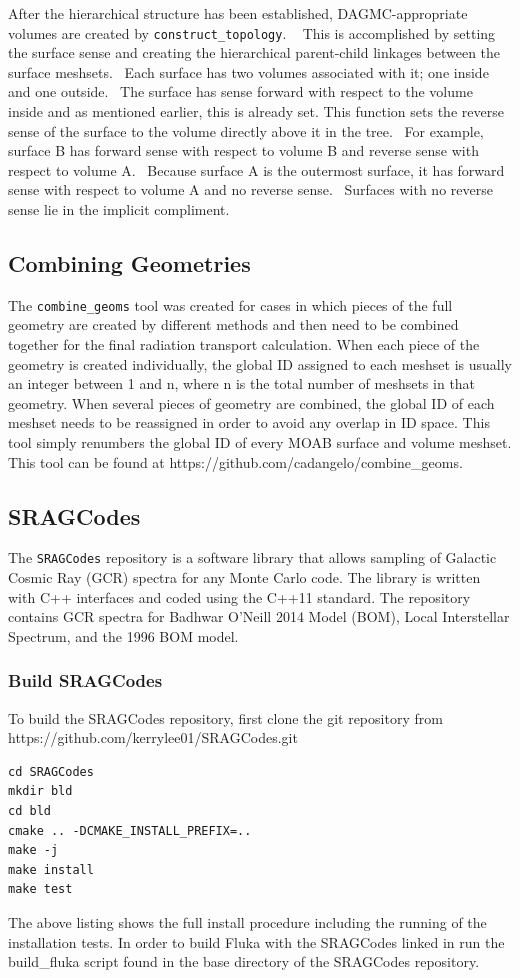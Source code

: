 After the hierarchical structure has been established, DAGMC-appropriate volumes are created by \texttt{construct\_topology}.  
This is accomplished by setting the surface sense and creating the hierarchical parent-child linkages between the 
surface meshsets.  Each surface has two volumes associated with it; one inside and one outside.  The surface has 
sense forward with respect to the volume inside and as mentioned earlier, this is already set. This function sets 
the reverse sense of the surface to the volume directly above it in the tree.  For example, surface B has forward 
sense with respect to volume B and reverse sense with respect to volume A.  Because surface A is the outermost surface, 
it has forward sense with respect to volume A and no reverse sense.  Surfaces with no reverse sense lie in the 
implicit compliment.

\subsection{Combining Geometries}
The \texttt{combine\_geoms} tool was created for cases in which pieces of the full geometry are created
by different methods and then need to be combined together for the final radiation transport
calculation.  When each piece of the geometry is created individually, the global ID assigned
to each meshset is usually an integer between 1 and n, where n is the total number of 
meshsets in that geometry.  When several pieces of geometry are combined, the global ID of each
meshset needs to be reassigned in order to avoid any overlap in ID space.  This tool simply 
renumbers the global ID of every MOAB surface and volume meshset.  This tool can be found at
https://github.com/cadangelo/combine\_geoms.

\subsection{SRAGCodes}
The \texttt{SRAGCodes} repository is a software library that allows sampling of Galactic Cosmic Ray (GCR)
spectra for any Monte Carlo code. The library is written with C++ interfaces and coded using the C++11 
standard. The repository contains GCR spectra for Badhwar O'Neill 2014 Model (BOM), Local Interstellar Spectrum, and
the 1996 BOM model.

\subsubsection*{Build SRAGCodes}
To build the SRAGCodes repository, first clone the git repository from https://github.com/kerrylee01/SRAGCodes.git
\lstset{language=bash} 
\begin{lstlisting}
cd SRAGCodes
mkdir bld
cd bld
cmake .. -DCMAKE_INSTALL_PREFIX=..
make -j
make install
make test
\end{lstlisting}
The above listing shows the full install procedure including the running of the installation tests. In order to build
Fluka with the SRAGCodes linked in run the build\_fluka script found in the base directory of the SRAGCodes repository.
